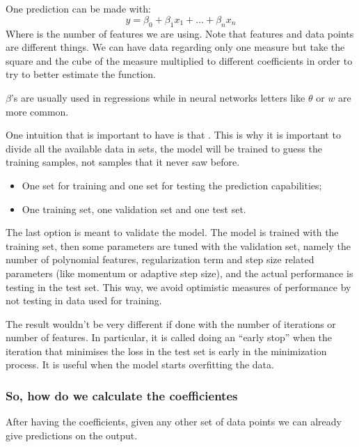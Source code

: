 One prediction can be made with:
\begin{equation}
    \hat{y} = \beta_0 + \beta_1 x_1 + \dots + \beta_n x_n
\end{equation}
Where  is the number of features we are using. Note that features and data points are different things. We can have data regarding only one measure but take the square and the cube of the measure multiplied to different coefficients in order to try to better estimate the function.

$\beta$'s are usually used in regressions while in neural networks letters like $\theta$ or $w$ are more common.


One intuition that is important to have is that . This is why it is important to divide all the available data in sets, the model will be trained to guess the training samples, not samples that it never saw before.
\begin{itemize}
    \item One set for training and one set for testing the prediction capabilities;
    \item One training set, one validation set and one test set.
\end{itemize}

The last option is meant to validate the model. The model is trained with the training set, then some parameters are tuned with the validation set, namely the number of polynomial features, regularization term and step size related parameters (like momentum or adaptive step size), and the actual performance is testing in the test set. This way, we avoid optimistic measures of performance by not testing in data used for training. 


The result wouldn't be very different if done with the number of iterations or number of features. In particular, it is called doing an ``early stop'' when the iteration that minimises the loss in the test set is early in the minimization process. It is useful when the model starts overfitting the data.



\subsubsection{So, how do we calculate the coefficientes}
\label{sec:calcBetas}
After having the coefficients, given any other set of data points we can already give predictions on the output.

